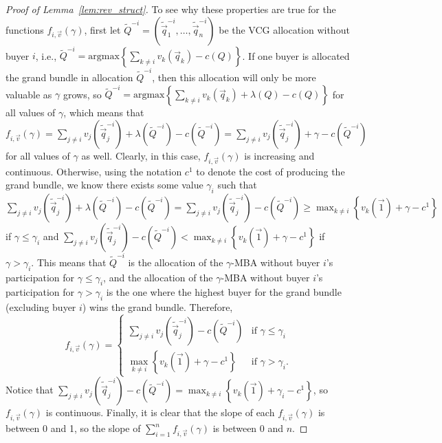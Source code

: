 \begin{proof}[Proof of Lemma~\ref{lem:rev_struct}]
To see why these properties are true for the functions $f_{i,\vec{v}}(\gamma)$, first let $\tilde{Q}^{-i} = \left(\tilde{\vec{q}}^{-i}_1, \dots, \tilde{\vec{q}}^{-i}_n\right)$ be the VCG allocation without buyer $i$, i.e., $\tilde{Q}^{-i} = \text{argmax} \left\{\sum_{k \not=i} v_k\left(\vec{q}_k\right) - c(Q)\right\}$. If one buyer is allocated the grand bundle in allocation $\tilde{Q}^{-i}$, then this allocation will only be more valuable as $\gamma$ grows, so $\tilde{Q}^{-i} = \text{argmax} \left\{\sum_{k \not=i} v_k\left(\vec{q}_k\right) + \lambda\left(Q\right) - c(Q)\right\}$ for all values of $\gamma$, which means that $f_{i,\vec{v}}(\gamma) = \sum_{j \not= i} v_j\left(\tilde{\vec{q}}_j^{-i}\right) + \lambda\left(\tilde{Q}^{-i}\right) - c\left(\tilde{Q}^{-i}\right) = \sum_{j \not= i} v_j\left(\tilde{\vec{q}}_j^{-i}\right) + \gamma - c\left(\tilde{Q}^{-i}\right)$ for all values of $\gamma$ as well. Clearly, in this case, $f_{i,\vec{v}}(\gamma)$ is increasing and continuous. Otherwise, using the notation $c^1$ to denote the cost of producing the grand bundle, we know there exists some value $\gamma_i$ such that $\sum_{j \not= i} v_j\left(\tilde{\vec{q}}_j^{-i}\right) + \lambda\left(\tilde{Q}^{-i}\right) - c\left(\tilde{Q}^{-i}\right) = \sum_{j \not= i} v_j\left(\tilde{\vec{q}}_j^{-i}\right) - c\left(\tilde{Q}^{-i}\right) \geq \max_{k \not= i} \left\{v_k\left(\vec{1}\right) + \gamma - c^1\right\}$ if $\gamma \leq \gamma_i$ and
$\sum_{j \not= i} v_j\left(\tilde{\vec{q}}_j^{-i}\right) - c\left(\tilde{Q}^{-i}\right) < \max_{k \not= i} \left\{v_k\left(\vec{1}\right) + \gamma - c^1\right\}$ if $\gamma > \gamma_i.$ This means that $\tilde{Q}^{-i}$ is the allocation of the $\gamma$-MBA without buyer $i$'s participation for $\gamma \leq \gamma_i$, and the allocation of the $\gamma$-MBA without buyer $i$'s participation for $\gamma > \gamma_i$ is the one where the highest buyer for the grand bundle (excluding buyer $i$) wins the grand bundle. Therefore, \[f_{i,\vec{v}}(\gamma) = \begin{cases} \sum_{j \not= i} v_j\left(\tilde{\vec{q}}_j^{-i}\right) - c\left(\tilde{Q}^{-i}\right) & \text{if } \gamma \leq \gamma_i\\ \max_{k \not= i} \left\{v_k\left(\vec{1}\right) + \gamma - c^1\right\} &\text{if } \gamma > \gamma_i.\end{cases}\] Notice that $\sum_{j \not= i} v_j\left(\tilde{\vec{q}}_j^{-i}\right) - c\left(\tilde{Q}^{-i}\right) = \max_{k \not= i} \left\{v_k\left(\vec{1}\right) + \gamma_i - c^1\right\}$, so $f_{i,\vec{v}}(\gamma)$ is continuous. Finally, it is clear that the slope of each $f_{i,\vec{v}}(\gamma)$ is between 0 and 1, so the slope of $\sum_{i = 1}^n f_{i,\vec{v}}(\gamma)$ is between 0 and $n$.


\end{proof}
